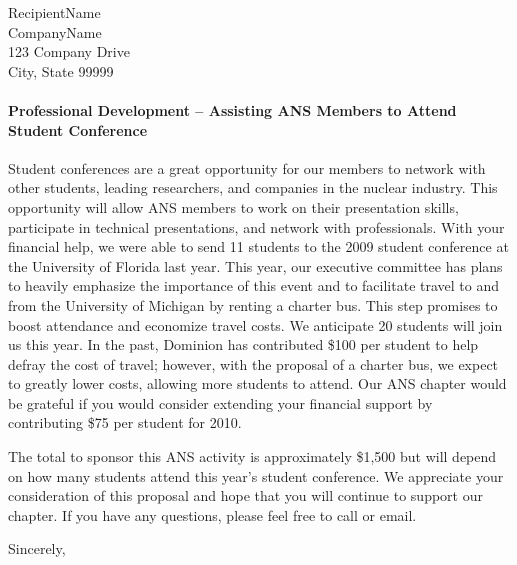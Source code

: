 \documentclass{letter}
\begin{document}
\begin{letter}{RecipientName\\
CompanyName\\
123 Company Drive\\
City, State 99999
}
\paragraph{Professional Development – Assisting ANS Members to Attend Student Conference}
Student conferences are a great opportunity for our members to network with other students, leading researchers, and companies in the nuclear industry.  This opportunity will allow ANS members to work on their presentation skills, participate in technical presentations, and network with professionals.  With your financial help, we were able to send 11 students to the 2009 student conference at the University of Florida last year. This year, our executive committee has plans to heavily emphasize the importance of this event and to facilitate travel to and from the University of Michigan by renting a charter bus. This step promises to boost attendance and economize travel costs. We anticipate 20 students will join us this year.  In the past, Dominion has contributed \$100 per student to help defray the cost of travel; however, with the proposal of a charter bus, we expect to greatly lower costs, allowing more students to attend. Our ANS chapter would be grateful if you would consider extending your financial support by contributing \$75 per student for 2010.

The total to sponsor this ANS activity is approximately \$1,500 but will depend on how many students attend this year’s student conference.  We appreciate your consideration of this proposal and hope that you will continue to support our chapter.
If you have any questions, please feel free to call or email. 




	\closing{Sincerely,}

 \end{letter}
\end{document}
